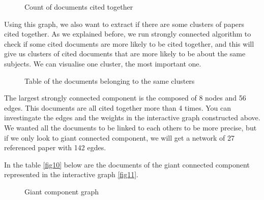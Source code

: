 \documentclass[journal,twocolumn]{IEEEtran}
\begin{document}
    \begin{figure}
        \begin{center}\end{center}
        \caption{Count of documents cited together}
        \label{fig8}
    \end{figure}
    
    Using this graph, we also want to extract if there are some clusters of
papers cited together. As we explained before, we run strongly connected
algorithm to check if some cited documents are more likely to be cited
together, and this will give us clusters of cited documents that are
more likely to be about the same subjects. We can visualise one cluster,
the most important one.



    \begin{figure}
        \begin{center}\end{center}
        \caption{Table of the documents belonging to the same clusters}
        \label{fig9}
    \end{figure}
    


    \begin{figure}
        \begin{center}\end{center}
        \caption{}
        \label{}
    \end{figure}
    
    The largest strongly connected component is the composed of 8 nodes and
56 edges. This documents are all cited together more than 4 times. You
can investingate the edges and the weights in the interactive graph
constructed above. We wanted all the documents to be linked to each
others to be more precise, but if we only look to giant connected
component, we will get a network of 27 referenced paper with 142 egdes.


    In the table \ref{fig10} below are the documents of the giant connected
component represented in the interactive graph \ref{fig11}.


    \begin{figure}
        \begin{center}\end{center}
        \caption{Giant component graph}
        \label{fig12}
    \end{figure}
    
\end{document}
